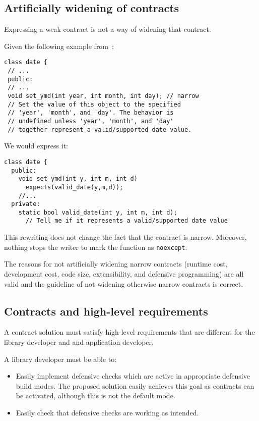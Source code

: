 \subsection{Artificially widening of contracts}

Expressing a weak contract is not a way of widening that contract.

Given the following example from~\cite{n3997}:

\begin{lstlisting}
class date {
 // ...
 public:
 // ... 
 void set_ymd(int year, int month, int day); // narrow
 // Set the value of this object to the specified
 // 'year', 'month', and 'day'. The behavior is 
 // undefined unless 'year', 'month', and 'day' 
 // together represent a valid/supported date value. 
\end{lstlisting}

We would express it:

\begin{lstlisting}
class date {
  public:
    void set_ymd(int y, int m, int d)
      expects(valid_date(y,m,d));
    //...
  private:
    static bool valid_date(int y, int m, int d);
      // Tell me if it represents a valid/supported date value
\end{lstlisting}

This rewriting does not change the fact that the contract is narrow. Moreover,
nothing stops the writer to mark the function as \texttt{noexcept}.

The reasons for not artificially widening narrow contracts (runtime cost,
development cost, code size, extensibility, and defensive programming) are all
valid and the guideline of not widening otherwise narrow contracts is correct.


\subsection{Contracts and high-level requirements}

A contract solution must satisfy high-level requirements that are different for
the library developer and and application developer.

A library developer must be able to:

\begin{itemize}

\item Easily implement defensive checks which are active in appropriate
defensive build modes. The proposed solution easily achieves this goal as
contracts can be activated, although this is not the default mode.

\item Easily check that defensive checks are working as intended. 

\end{itemize}

